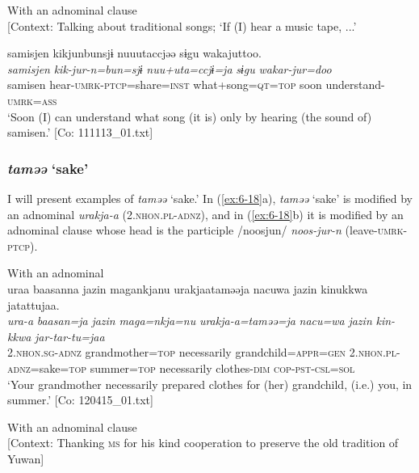 \ex With an adnominal clause\\{}
[Context: Talking about traditional songs; {\TM} ‘If (I) hear a music tape, ...’

{\TM}
\glll samisjen  kikjunbunsjɨ  nuuutaccjəə     sɨgu  wakajuttoo.\\
      \textit{samisjen}  \textit{kik-jur-n=bun=sjɨ}  \textit{nuu+uta=ccjɨ=ja} \textit{sɨgu}  \textit{wakar-jur=doo}\\
      samisen  hear-\textsc{umrk}-\textsc{ptcp}=share=\textsc{inst}  what+song=\textsc{qt}=\textsc{top}      soon  understand-\textsc{umrk}=\textsc{ass}\\
\glt ‘Soon (I) can understand what song (it is) only by hearing (the sound of) samisen.’ [Co: 111113\_01.txt]
\z
\z

\subsubsection{\textit{taməə} ‘sake’}

I will present examples of \textit{taməə} ‘sake.’ In (\ref{ex:6-18}a), \textit{taməə} ‘sake’ is modified by an adnominal \textit{urakja-a} (2.\textsc{nhon}.\textsc{pl}-\textsc{adnz}), and in (\ref{ex:6-18}b) it is modified by an adnominal clause whose head is the participle /noosjun/ \textit{noos-jur-n} (leave-\textsc{umrk}-\textsc{ptcp}).

\ea\label{ex:6-18}
\ea With an adnominal\\
{\TM}
\glll  uraa  baasanna  jazin  magankjanu  urakjaataməəja  {\textbar}nacuwa{\textbar}  jazin      kinukkwa  jatattujaa.\\
\textit{ura-a}  \textit{baasan=ja}  \textit{jazin}  \textit{maga=nkja=nu}     \textit{urakja-a=taməə=ja}  \textit{nacu=wa}  \textit{jazin}     \textit{kin-kkwa}  \textit{jar-tar-tu=jaa} \\
2.\textsc{nhon}.\textsc{sg}-\textsc{adnz}  grandmother=\textsc{top}  necessarily  grandchild=\textsc{appr}=\textsc{gen}   2.\textsc{nhon}.\textsc{pl}-\textsc{adnz}=sake=\textsc{top}  summer=\textsc{top}  necessarily clothes-\textsc{dim}  \textsc{cop}-\textsc{pst}-\textsc{csl}=\textsc{sol}\\
\glt ‘Your grandmother necessarily prepared clothes for (her) grandchild, (i.e.) you, in summer.’ [Co: 120415\_01.txt]

\ex With an adnominal clause\\{}
[Context: Thanking \textsc{ms} for his kind cooperation to preserve the old tradition of Yuwan]

